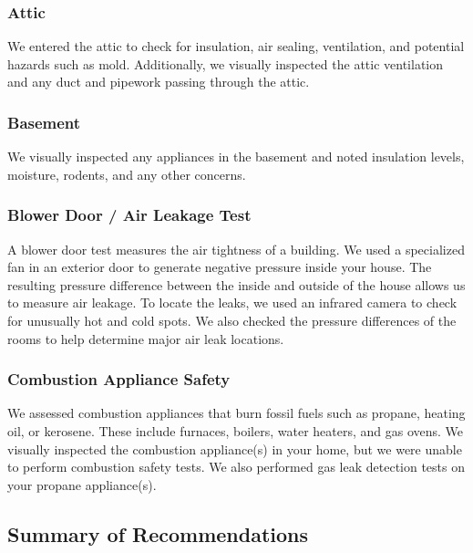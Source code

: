 \documentclass[
  letterpaper,
  DIV=11,
  numbers=noendperiod]{scrartcl}
\begin{document}
\subsubsection{Attic}\label{attic}

We entered the attic to check for insulation, air sealing, ventilation,
and potential hazards such as mold. Additionally, we visually inspected
the attic ventilation and any duct and pipework passing through the
attic.

\subsubsection{Basement}\label{basement}

We visually inspected any appliances in the basement and noted
insulation levels, moisture, rodents, and any other concerns.

\subsubsection{Blower Door / Air Leakage
Test}\label{blower-door-air-leakage-test}

A blower door test measures the air tightness of a building. We used a
specialized fan in an exterior door to generate negative pressure inside
your house. The resulting pressure difference between the inside and
outside of the house allows us to measure air leakage. To locate the
leaks, we used an infrared camera to check for unusually hot and cold
spots. We also checked the pressure differences of the rooms to help
determine major air leak locations.

\subsubsection{Combustion Appliance
Safety}\label{combustion-appliance-safety}

We assessed combustion appliances that burn fossil fuels such as
propane, heating oil, or kerosene. These include furnaces, boilers,
water heaters, and gas ovens. We visually inspected the combustion
appliance(s) in your home, but we were unable to perform combustion
safety tests. We also performed gas leak detection tests on your propane
appliance(s).

\newpage{}

\subsection{Summary of
Recommendations}\label{summary-of-recommendations}
\end{document}

